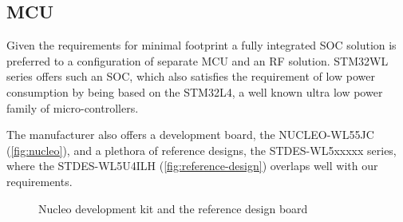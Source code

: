 \subsection{\label{section:mcu} MCU}
Given the requirements for minimal footprint a fully integrated SOC solution is preferred to a configuration of separate MCU and an RF solution. STM32WL series offers such an SOC, which also satisfies the requirement of low power consumption by being based on the STM32L4, a well known ultra low power family of micro-controllers.

The manufacturer also offers a development board, the NUCLEO-WL55JC (\ref{fig:nucleo}), and a plethora of reference designs, the STDES-WL5xxxxx series, where the STDES-WL5U4ILH (\ref{fig:reference-design}) overlaps well with our requirements.

\begin{figure}
    \centering
    \caption{\label{fig:nucleo-and-reference} Nucleo development kit and the reference design board}
\end{figure}


